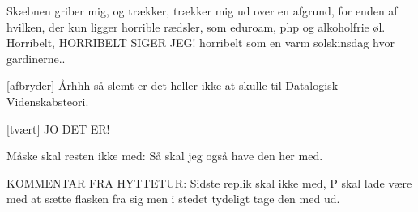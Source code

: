 \documentclass[a4paper,11pt]{article}
\begin{document}
\begin{sketch}

 Skæbnen griber mig, og trækker, trækker mig ud over en afgrund, for enden af
    hvilken, der kun ligger horrible rædsler, som eduroam, php og alkoholfrie øl.
    Horribelt, HORRIBELT SIGER JEG! horribelt som en varm solskinsdag hvor gardinerne..

[afbryder] Århhh så slemt er det heller ikke at skulle til Datalogisk Videnskabsteori.

[tvært] JO DET ER!

Måske skal resten ikke med:
 Så skal jeg også have den her med.

KOMMENTAR FRA HYTTETUR: Sidste replik skal ikke med, P skal lade være med at sætte flasken fra sig men i stedet tydeligt tage den med ud.

\end{sketch}
\end{document}
